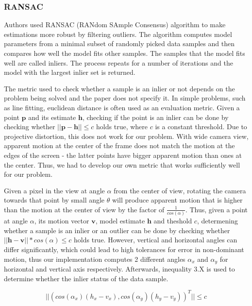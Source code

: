 \documentclass[11pt,english]{report}
\begin{document}
\subsubsection{RANSAC}

Authors used RANSAC\cite{FISCHLER1987726} (RANdom SAmple Consensus) algorithm to make estimations more robust by filtering outliers. The algorithm computes model parameters from a minimal subset of randomly picked data samples and then compares how well the model fits other samples. The samples that the model fits well are called inliers. The process repeats for a number of iterations and the model with the largest inlier set is returned.

The metric used to check whether a sample is an inlier or not depends on the problem being solved and the paper does not specify it. In simple problems, such as line fitting, euclidean distance is often used as an evaluation metric. Given a point $\mathbf{p}$ and its estimate $\mathbf{h}$, checking if the point is an inlier can be done by checking whether $||\mathbf{p} - \mathbf{h}|| \leq c$ holds true, where $c$ is a constant threshold. Due to projective distortion, this does not work for our problem. With wide camera view, apparent motion at the center of the frame does not match the motion at the edges of the screen - the latter points have bigger apparent motion than ones at the center. Thus, we had to develop our own metric that works sufficiently well for our problem.

Given a pixel in the view at angle $\alpha$ from the center of view, rotating the camera towards that point by small angle $\theta$ will produce apparent motion that is higher than the motion at the center of view by the factor of $\frac{1}{cos(\alpha)}$. Thus, given a point at angle $\alpha$, its motion vector $\mathbf{v}$, model estimate $\mathbf{h}$ and theshold $c$, determening whether a sample is an inlier or an outlier can be done by checking whether $||\mathbf{h} - \mathbf{v}|| * cos(\alpha) \leq c$ holds true. However, vertical and horizontal angles can differ significantly, which could lead to high tolerances for error in non-dominant motion, thus our implementation computes 2 different angles $\alpha_x$ and $\alpha_y$ for horizontal and vertical axis respectively. Afterwards, inequality 3.X is used to determine whether the inlier status of the data sample.

\begin{equation}
	||(cos(\alpha_x) (h_x - v_x), cos(\alpha_y) (h_y - v_y))^T|| \leq c
\end{equation}
\end{document}
